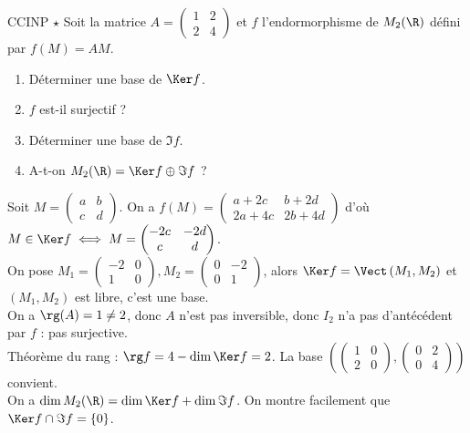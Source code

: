 \documentclass[11pt]{article}
\begin{document}
\begin{exercice}{CCINP $\star$}{}
    Soit la matrice $A=\begin{pmatrix}1&2\\2&4\end{pmatrix}$ et $f$ l'endormorphisme de $M_2(\R)$ défini par $f(M)=AM$.
    \begin{enumerate}
        \item Déterminer une base de $\Ker f$.
        \item $f$ est-il surjectif ?
        \item Déterminer une base de $\Im f$.
        \item A-t-on $M_2(\R)=\Ker f\oplus \Im f$ ?
    \end{enumerate}
    \tcblower
     Soit $M=\begin{pmatrix}a&b\\c&d\end{pmatrix}$. On a $f(M)=\begin{pmatrix}a+2c&b+2d\\2a + 4c&2b+4d\end{pmatrix}$ d'où $M\in\Ker f \iff M = \begin{pmatrix}-2c & -2d \\ c & d\end{pmatrix}$.\\
    On pose $M_1 =\begin{pmatrix}-2 & 0 \\ 1 & 0\end{pmatrix}, M_2 = \begin{pmatrix}0 & -2 \\ 0 & 1\end{pmatrix}$, alors $\Ker f = \Vect\left(M_1, M_2\right)$ et $(M_1,M_2)$ est libre, c'est une base.\\
     On a $\rg(A)=1\neq2$, donc $A$ n'est pas inversible, donc $I_2$ n'a pas d'antécédent par $f$ : pas surjective.\\
     Théorème du rang : $\rg f = 4 - \dim \Ker f = 2$. La base $\left( \begin{pmatrix}1&0\\2&0\end{pmatrix}, \begin{pmatrix}0&2\\0&4\end{pmatrix} \right)$ convient.\\
     On a $\dim M_2(\R)=\dim \Ker f + \dim \Im f$. On montre facilement que $\Ker f \cap \Im f = \{0\}$.
\end{exercice}
\end{document}
